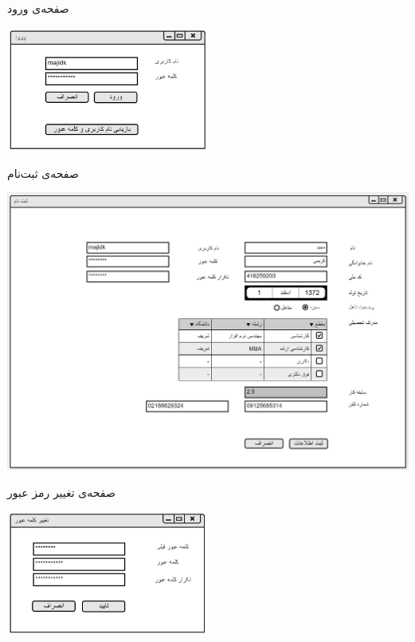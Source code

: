 \documentclass{article}
\begin{document}
\vspace{1cm}
صفحه‌ی ورود
\begin{center}
\includegraphics[width=0.5\textwidth]{Prototype/Accounting/Login.png}
\end{center}

\newpage
\vspace{1cm}
صفحه‌ی ثبت‌نام
\begin{center}
\includegraphics[width=\textwidth]{Prototype/Accounting/Register.png}
\end{center}

\vspace{1cm}
صفحه‌ی تغییر رمز عبور
\begin{center}
\includegraphics[width=0.5\textwidth]{Prototype/Accounting/ChangePassword.png}
\end{center}
\end{document}
